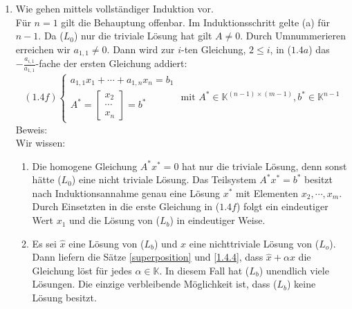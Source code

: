 \begin{enumerate}
\item Wie gehen mittels vollständiger Induktion vor.\\
Für $n=1$ gilt die Behauptung offenbar.  Im Induktionsschritt gelte (a) für $n-1$.  Da (\hyperref[L0]{$L_0$}) nur die triviale Lösung hat gilt $A\not= 0$.  Durch Umnummerieren erreichen wir $a_{1,1}\not= 0$.  Dann wird zur $i$-ten Gleichung, $2\leq i$, in ($1.4a$) das $-\frac{a_{i,1}}{a_{1,1}}$-fache der ersten Gleichung addiert:
\[(1.4f)\begin{cases}a_{1,1}x_1+\cdots +a_{1,n}x_n = b_1\\ A^*=\left[\begin{array}{c}x_2\\ \cdots \\ x_n\end{array}\right]= b^*\end{cases} \text{ mit }A^*\in \mathbb{K}^{(n-1)\times (m-1)}, b^*\in \mathbb{K}^{n-1} \]
Beweis: \\
Wir wissen:
\begin{enumerate}
\item Die homogene Gleichung $A^*x^* = 0$ hat nur die triviale Lösung, denn sonst hätte (\hyperref[L0]{$L_0$}) eine nicht triviale Lösung.  Das Teilsystem $A^*x^* = b^*$ besitzt nach Induktionsannahme genau eine Lösung $x^*$ mit Elementen $x_2,\cdots ,x_m$.  Durch Einsetzten in die erste Gleichung in ($1.4f$) folgt ein eindeutiger Wert $x_1$ und die Lösung von (\hyperref[Lb]{$L_b$}) in eindeutiger Weise.
\item Es sei $\hat{x}$ eine Lösung von (\hyperref[Lb]{$L_b$}) und $x$ eine nichttriviale Lösung von ($L_o$).  Dann liefern die Sätze \hyperref[superposition]{\ref*{superposition}} und \hyperref[1.4.4]{\ref*{1.4.4}}, dass $\hat{x}+\alpha x$ die Gleichung löst für jedes $\alpha \in \mathbb{K}$.  In diesem Fall hat (\hyperref[Lb]{$L_b$}) unendlich viele Lösungen.  Die einzige verbleibende Möglichkeit ist, dass (\hyperref[Lb]{$L_b$}) keine Lösung besitzt.
\end{enumerate}
\end{enumerate}

